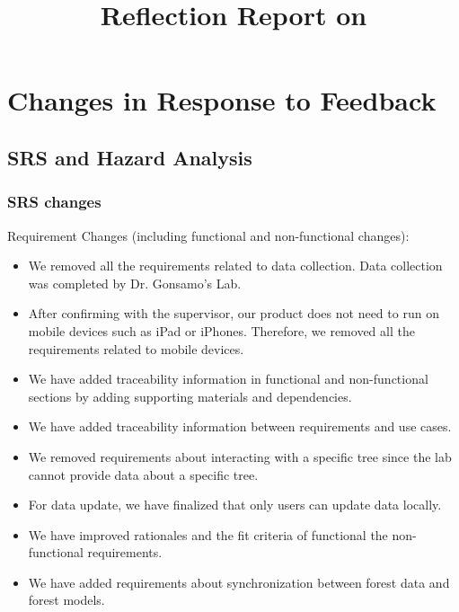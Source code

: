 \documentclass{article}
\title{Reflection Report on \progname}
\author{\authname}
\date{}
\begin{document}
\maketitle

\newpage

\tableofcontents

\newpage

\section{Changes in Response to Feedback}

\subsection{SRS and Hazard Analysis}
\subsubsection{SRS changes}
Requirement Changes (including functional and non-functional changes):
\begin{itemize}
\item We removed all the requirements related to data collection. Data collection
was completed by Dr. Gonsamo's Lab.
\item  After confirming with the supervisor, our product does not need to 
run on mobile devices such as iPad or iPhones. Therefore, we removed all the 
requirements related to mobile devices.
\item We have added traceability information in functional and non-functional 
sections by adding supporting materials and dependencies.
\item We have added traceability information between requirements and use cases.
\item We removed requirements about interacting with a specific tree since 
the lab cannot provide data about a specific tree.
\item For data update, we have finalized that only users can update data 
locally.
\item We have improved rationales and the fit criteria of functional the 
non-functional requirements. 
\item We have added requirements about synchronization between forest data and 
forest models.
\end{itemize}
\end{document}
